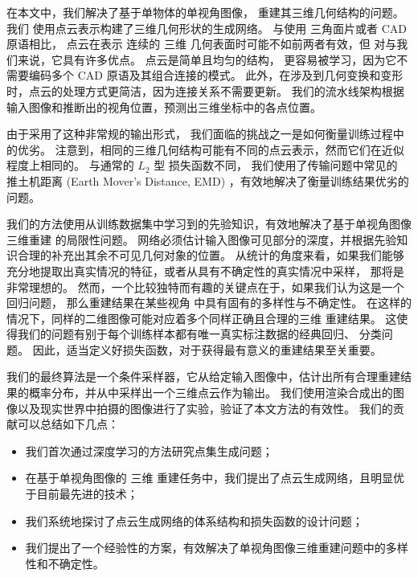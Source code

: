 在本文中，我们解决了基于单物体的单视角图像，
重建其三维几何结构的问题。
我们%
使用点云表示构建了三维几何形状的生成网络。
与使用
三角面片或者 CAD 原语相比，
点云在表示 %
连续的 三维 几何表面时可能不如前两者有效，但
对与我们来说，它具有许多优点。
点云是简单且均匀的结构， 更容易被学习，因为它不需要编码多个 CAD 原语及其组合连接的模式。
此外，在涉及到几何变换和变形时，点云的处理方式更简洁，因为连接关系不需要更新。 我们的流水线架构根据输入图像和推断出的视角位置，预测出三维坐标中的各点位置。

由于采用了这种非常规的输出形式，
我们面临的挑战之一是如何衡量训练过程中的优劣。
注意到，相同的三维几何结构可能有不同的点云表示，然而它们在近似程度上相同的。
与通常的 $L_2$ %
型%
损失函数不同，
我们使用了传输问题中常见的 %
推土机距离 (Earth Mover's Distance, EMD) %
，有效地解决了衡量训练结果优劣的问题。%

我们的方法使用从训练数据集中学习到的先验知识，有效地解决了基于单视角图像三维重建
的局限性问题。
网络必须估计输入图像可见部分的深度，并根据先验知识合理的补充出其余不可见几何对象的位置。
从统计的角度来看，如果我们能够充分地提取出真实情况的特征，或者从具有不确定性的真实情况中采样，
那将是非常理想的。
然而，一个比较独特而有趣的关键点在于，如果我们认为这是一个回归问题，
那么重建结果在某些视角%
中具有固有的多样性与不确定性。
在这样的情况下，同样的二维图像可能对应着多个同样正确且合理的三维 重建结果。
这使得我们的问题有别于每个训练样本都有唯一真实标注数据的经典回归、%
分类问题。%
因此，适当定义好损失函数，对于获得最有意义的重建结果至关重要。



我们的最终算法是一个条件采样器，它从给定输入图像中，估计出所有合理重建结果的概率分布，并从中采样出一个三维点云作为输出。
我们使用渲染合成出的图像以及现实世界中拍摄的图像进行了实验，验证了本文方法的有效性。
我们的贡献可以总结如下几点：
\begin{itemize}
	\item 我们首次通过深度学习的方法研究点集生成问题；
	\item 在基于单视角图像的 三维 重建任务中，我们提出了点云生成网络，且明显优于目前最先进的技术；
	\item 我们系统地探讨了点云生成网络的体系结构和损失函数的设计问题；
	\item 我们提出了一个经验性的方案，有效解决了单视角图像三维重建问题中的多样性和不确定性。
\end{itemize}









